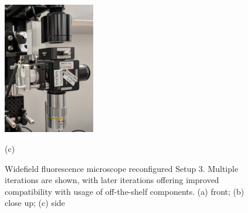 \begin{figure}[htb]
	\begin{minipage}[t]{0.32\linewidth}\centering
		\includegraphics[width=4cm]{2_body/figures/setup4-closeup.jpg}
		\centerline{(c)}
	\end{minipage}
	\caption{
		Widefield fluorescence microscope reconfigured Setup 3.
		Multiple iterations are shown, with later iterations offering improved compatibility with usage of off-the-shelf components.
		(a) front; (b) close up; (c) side}
	\label{fig:motion sensors}
\end{figure}


\clearpage

